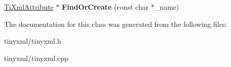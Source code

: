 \begin{DoxyCompactItemize}
\item 
\hypertarget{class_ti_xml_attribute_set_a5e28f5d32f048fba85d04dc317495bdc}{\hyperlink{class_ti_xml_attribute}{\-Ti\-Xml\-Attribute} $\ast$ {\bfseries \-Find\-Or\-Create} (const char $\ast$\-\_\-name)}\label{class_ti_xml_attribute_set_a5e28f5d32f048fba85d04dc317495bdc}

\end{DoxyCompactItemize}


\-The documentation for this class was generated from the following files\-:\begin{DoxyCompactItemize}
\item 
tinyxml/tinyxml.\-h\item 
tinyxml/tinyxml.\-cpp\end{DoxyCompactItemize}
